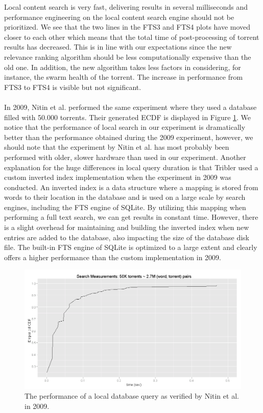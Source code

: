 Local content search is very fast, delivering results in several milliseconds and performance engineering on the local content search engine should not be prioritized. We see that the two lines in the FTS3 and FTS4 plots have moved closer to each other which means that the total time of post-processing of torrent results has decreased. This is in line with our expectations since the new relevance ranking algorithm should be less computationally expensive than the old one. In addition, the new algorithm takes less factors in considering, for instance, the swarm health of the torrent. The increase in performance from FTS3 to FTS4 is visible but not significant.\\\\
In 2009, Nitin et al. performed the same experiment where they used a database filled with 50.000 torrents. Their generated ECDF is displayed in Figure \ref{fig:local-search-nitin}. We notice that the performance of local search in our experiment is dramatically better than the performance obtained during the 2009 experiment, however, we should note that the experiment by Nitin et al. has most probably been performed with older, slower hardware than used in our experiment. Another explanation for the huge differences in local query duration is that Tribler used a custom inverted index implementation when the experiment in 2009 was conducted. An inverted index is a data structure where a mapping is stored from words to their location in the database and is used on a large scale by search engines, including the FTS engine of SQLite. By utilizing this mapping when performing a full text search, we can get results in constant time. However, there is a slight overhead for maintaining and building the inverted index when new entries are added to the database, also impacting the size of the database disk file. The built-in FTS engine of SQLite is optimized to a large extent and clearly offers a higher performance than the custom implementation in 2009.

\begin{figure}[h!]
	\centering
	\includegraphics[width=1.0\columnwidth]{images/experiments/nitin_local_search}
	\caption{The performance of a local database query as verified by Nitin et al. in 2009.}
	\label{fig:local-search-nitin}
\end{figure}

